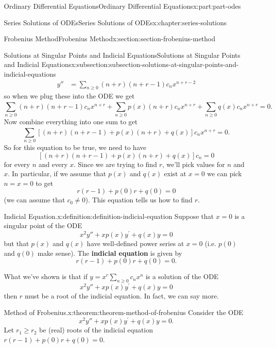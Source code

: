 \documentclass[twoside,10pt,]{book}
\newcommand{\terminology}[1]{\textbf{#1}}
\numberwithin{equation}{part}
\newcommand{\amp}{&}
\begin{document}
\begin{partptx}{Ordinary Differential Equations}{}{Ordinary Differential Equations}{}{}{x:part:part-odes}
\begin{chapterptx}{Series Solutions of ODEs}{}{Series Solutions of ODEs}{}{}{x:chapter:series-solutions}
\begin{sectionptx}{Frobenius Method}{}{Frobenius Method}{}{}{x:section:section-frobenius-method}
\begin{subsectionptx}{Solutions at Singular Points and Indicial Equations}{}{Solutions at Singular Points and Indicial Equations}{}{}{x:subsection:subsection-solutions-at-singular-points-and-indicial-equations}
\begin{align*}
y'' \amp= \sum_{n\geq0}^{}(n+r)(n+r-1)c_{n}x^{n+r-2}
\end{align*}
so when we plug these into the ODE we get%
\begin{equation*}
\sum_{n\geq0}^{}(n+r)(n+r-1)c_{n}x^{n+r}+\sum_{n\geq0}^{}p(x)(n+r)c_{n}x^{n+r}+\sum_{n\geq0}^{}q(x)c_{n}x^{n+r} = 0.
\end{equation*}
Now combine everything into one sum to get%
\begin{equation*}
\sum_{n\geq0}^{}\left[(n+r)(n+r-1)+p(x)(n+r)+q(x)\right]c_{n}x^{n+r} = 0.
\end{equation*}
So for this equation to be true, we need to have%
\begin{equation*}
\left[(n+r)(n+r-1)+p(x)(n+r)+q(x)\right]c_{n} = 0
\end{equation*}
for every \(n\) and every \(x\). Since we are trying to find \(r\), we'll pick values for \(n\) and \(x\). In particular, if we assume that \(p(x)\) and \(q(x)\) exist at \(x=0\) we can pick \(n=x=0\) to get%
\begin{equation*}
r(r-1)+p(0)r+q(0) = 0
\end{equation*}
(we can assume that \(c_{0}\neq0\)). This equation tells us how to find \(r\).%
\begin{definition}{Indicial Equation.}{x:definition:definition-indicial-equation}%
%
Suppose that \(x=0\) is a singular point of the ODE%
\begin{equation*}
x^{2}y''+xp(x)y^\prime+q(x)y=0
\end{equation*}
but that \(p(x)\) and \(q(x)\) have well-defined power series at \(x=0\) (i.e. \(p(0)\) and \(q(0)\) make sense). The \terminology{indicial equation} is given by%
\begin{equation*}
r(r-1)+p(0)r+q(0) = 0.
\end{equation*}
%
\end{definition}
What we've shown is that if \(y=x^{r}\sum_{n\geq0}^{}c_{n}x^{n}\) is a solution of the ODE%
\begin{equation*}
x^{2}y''+xp(x)y^\prime+q(x)y=0
\end{equation*}
then \(r\) must be a root of the indicial equation. In fact, we can say more.%
\begin{theorem}{Method of Frobenius.}{}{x:theorem:theorem-method-of-frobenius}%
%
Consider the ODE%
\begin{equation*}
x^{2}y''+xp(x)y^\prime+q(x)y=0.
\end{equation*}
Let \(r_{1}\geq r_{2}\) be (real) roots of the indicial equation \(r(r-1)+p(0)r+q(0)=0\).%

\end{theorem}
\end{subsectionptx}
\end{sectionptx}
\end{chapterptx}
\end{partptx}
\end{document}

